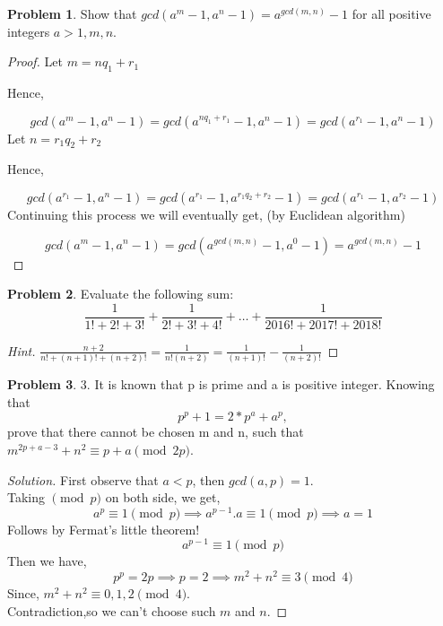 \documentclass[a4paper,oneside,12 pt]{book}
\theoremstyle{definition}
\theoremstyle{definition}
\newtheorem{prbm}{Problem}[section]
\theoremstyle{definition}
\begin{document}
\begin{prbm}
Show that $gcd(a^m-1,a^n-1)=a^{gcd(m,n)}-1$ for all positive integers $a>1,m,n.$
\begin{proof}
Let $m = nq_1 + r_1$

Hence,

$$gcd( a^m -1 , a^n -1) = gcd ( a^{nq_1 + r_1} -1 , a^n -1) = gcd( a^{r_1} -1, a^n-1)$$
Let $n = r_1q_2 + r_2$

Hence,

$$gcd( a^{r_1} -1 , a^ n -1) = gcd( a^{r_1} -1, a^{r_1q_2 + r_2} -1) = gcd( a^{r_1} -1 , a^{r_2} -1)$$
Continuing this process we will eventually get, (by Euclidean algorithm)

$$gcd(a^{m} -1, a^{n} -1) = gcd( a^{gcd(m,n)} -1 , a^0 -1) = a^{gcd(m,n)} -1$$
\end{proof}

\end{prbm}



\begin{prbm}
Evaluate the following sum:
$$\dfrac{1}{1!+2!+3!}+\dfrac{1}{2!+3!+4!}+\dots + \dfrac{1}{2016!+2017!+2018!}$$
\begin{proof}[Hint]
$\frac{n+2}{n!+(n+1)!+(n+2)!}=\frac{1}{n!(n+2)}=\frac{1}{(n+1)!}-\frac{1}{(n+2)!}$ 

\end{proof}

\end{prbm}



\begin{prbm}
3. It is known that p is prime and a is positive integer. Knowing that
$$p^p+1=2*p^a+a^p ,$$prove that there cannot be chosen m and n, such that $m^{2p+a-3}+n^2 \equiv p+a \pmod {2p}$.

\begin{proof}[Solution]

First observe that $a<p$, then $gcd(a,p)=1$.\\
Taking $\pmod{p}$ on both side, we get,
$$a^{p} \equiv 1 \pmod{p} \implies a^{p-1}.a \equiv 1 \pmod{p} \implies a=1$$Follows by Fermat's little theorem!
$$a^{p-1} \equiv 1 {\pmod{p}}$$Then we have,
$$p^p=2p \implies p=2 \implies m^2+n^2 \equiv 3 \pmod{4}$$Since, $m^2+n^2 \equiv 0,1,2 \pmod{4}$.\\
Contradiction,so we can't choose such $m$ and $n$.
\end{proof}

\end{prbm}
\end{document}
